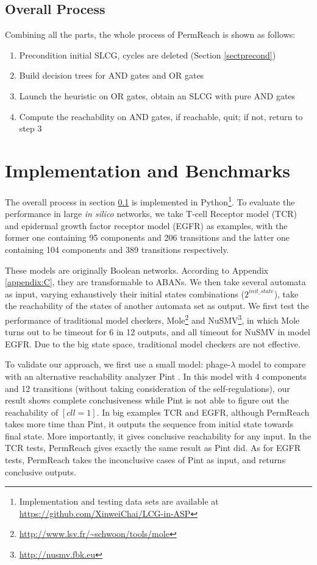 \documentclass[runningheads]{llncs}
\begin{document}
\subsection{Overall Process}\label{sectOverall}
Combining all the parts, the whole process of PermReach is shown as follows:
\begin{enumerate}
\item Precondition initial SLCG, cycles are deleted (Section \ref{sectprecond})
\item Build decision trees for AND gates and OR gates
\item Launch the heuristic on OR gates, obtain an SLCG with pure AND gates 
\item Compute the reachability on AND gates, if reachable, quit; if not, return to step 3 
\end{enumerate}

\section{Implementation and Benchmarks}\label{sect:5}
The overall process in section \ref{sectOverall} is implemented in Python\footnote{Implementation and testing data sets are available at \url{https://github.com/XinweiChai/LCG-in-ASP}}. 
To evaluate the performance in large \textit{in silico} networks, we take T-cell Receptor model (TCR) \cite{saez2007logical} and epidermal growth factor receptor model (EGFR) \cite{samaga2009logic} as examples, with the former one containing 95 components and 206 transitions and the latter one containing 104 components and 389 transitions respectively. 

These models are originally Boolean networks.
According to Appendix \ref{appendix:C}, they are transformable to ABANs. We then take several automata as input, varying exhaustively their initial states combinations ($2^{init\_state}$), take the reachability of the states of another automata set as output.
We first test the performance of traditional model checkers, Mole\footnote{\url{http://www.lsv.fr/~schwoon/tools/mole}} and NuSMV\footnote{\url{http://nusmv.fbk.eu}}, in which Mole turns out to be timeout for 6 in 12 outputs, and all timeout for NuSMV in model EGFR.
Due to the big state space, traditional model checkers are not effective. 

To validate our approach, we first use a small model: phage-$\lambda$ model \cite{thieffry1995dynamical} to compare with an alternative reachability analyzer Pint \cite{pauleve2012}. In this model with 4 components and 12 transitions (without taking consideration of the self-regulations), our result shows complete conclusiveness while Pint is not able to figure out the reachability of $[cll=1]$. 
In big examples TCR and EGFR,
although PermReach takes more time than Pint, it outputs the sequence from initial state towards final state.
More importantly, it gives conclusive reachability for any input. 
In the TCR tests, PermReach gives exactly the same result as Pint did. As for EGFR tests, PermReach takes the inconclusive cases of Pint as input, and returns conclusive outputs.
\end{document}
